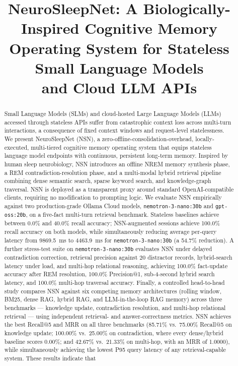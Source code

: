 \documentclass[conference]{IEEEtran}
\begin{document}
\title{NeuroSleepNet: A Biologically-Inspired Cognitive Memory\\ Operating System for Stateless Small Language Models\\ and Cloud LLM APIs}

\author{
}

\maketitle

\begin{abstract}
Small Language Models (SLMs) and cloud-hosted Large Language Models (LLMs) accessed through stateless APIs suffer from catastrophic context loss across multi-turn interactions, a consequence of fixed context windows and request-level statelessness. We present NeuroSleepNet (NSN), a zero-offline-consolidation-overhead, locally-executed, multi-tiered cognitive memory operating system that equips stateless language model endpoints with continuous, persistent long-term memory. Inspired by human sleep neurobiology, NSN introduces an offline NREM memory synthesis phase, a REM contradiction-resolution phase, and a multi-modal hybrid retrieval pipeline combining dense semantic search, sparse keyword search, and knowledge-graph traversal. NSN is deployed as a transparent proxy around standard OpenAI-compatible clients, requiring no modification to prompting logic. We evaluate NSN empirically against two production-grade Ollama Cloud models, \texttt{nemotron-3-nano:30b} and \texttt{gpt-oss:20b}, on a five-fact multi-turn retrieval benchmark. Stateless baselines achieve between 0.0\% and 40.0\% recall accuracy; NSN-augmented sessions achieve 100.0\% recall accuracy on both models, while simultaneously reducing average per-query latency from 9869.5~ms to 4463.9~ms for \texttt{nemotron-3-nano:30b} (a 54.7\% reduction). A further stress-test suite on \texttt{nemotron-3-nano:30b} evaluates NSN under delayed contradiction correction, retrieval precision against 20 distractor records, hybrid-search latency under load, and multi-hop relational reasoning, achieving 100.0\% fact-update accuracy after REM resolution, 100.0\% Precision@1, sub-4-second hybrid search latency, and 100.0\% multi-hop traversal accuracy. Finally, a controlled head-to-head study compares NSN against six competing memory architectures (rolling window, BM25, dense RAG, hybrid RAG, and LLM-in-the-loop RAG memory) across three benchmarks --- knowledge update, contradiction resolution, and multi-hop relational retrieval --- using independent retrieval- and answer-correctness metrics. NSN achieves the best Recall@5 and MRR on all three benchmarks (85.71\% vs.\ 75.00\% Recall@5 on knowledge update; 100.00\% vs.\ 25.00\% on contradiction, where every dense/hybrid baseline scores 0.00\%; and 42.67\% vs.\ 21.33\% on multi-hop, with an MRR of 1.0000), while simultaneously achieving the lowest P95 query latency of any retrieval-capable system. These results indicate that 
\end{abstract}
\end{document}
